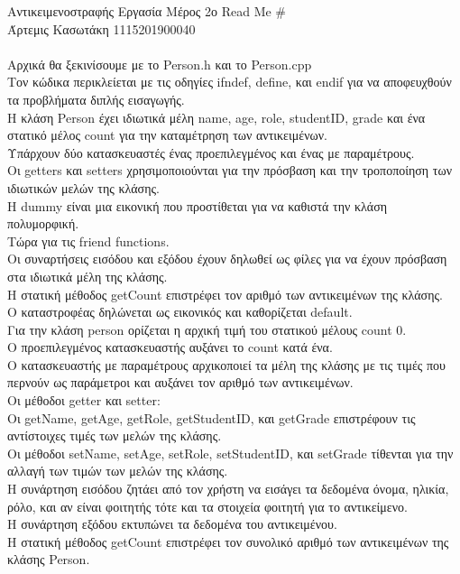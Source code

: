\documentclass[12pt]{article}
\begin{document}
\noindent Αντικειμενοστραφής Εργασία Μέρος 2ο \hfill Read Me \#\\
Άρτεμις Κασωτάκη 1115201900040
\\ \\ 

Αρχικά θα ξεκινίσουμε με το Person.h και το Person.cpp\\
Τον κώδικα περικλείεται με τις οδηγίες ifndef, define, και endif για να αποφευχθούν τα προβλήματα διπλής εισαγωγής. \\
Η κλάση Person έχει ιδιωτικά μέλη name, age, role, studentID, grade και ένα στατικό μέλος count για την καταμέτρηση των αντικειμένων.\\
Υπάρχουν δύο κατασκευαστές ένας προεπιλεγμένος και ένας με παραμέτρους.\\
Οι getters και setters χρησιμοποιούνται για την πρόσβαση και την τροποποίηση των ιδιωτικών μελών της κλάσης.\\
Η  dummy είναι μια εικονική  που προστίθεται για να καθιστά την κλάση πολυμορφική.\\
Τώρα για τις friend functions.\\
Οι συναρτήσεις εισόδου και εξόδου έχουν δηλωθεί ως φίλες για να έχουν πρόσβαση στα ιδιωτικά μέλη της κλάσης.\\
Η στατική μέθοδος getCount επιστρέφει τον αριθμό των αντικειμένων της κλάσης.\\
Ο καταστροφέας δηλώνεται ως εικονικός και καθορίζεται default.\\

Για την κλάση person ορίζεται η αρχική τιμή του στατικού μέλους count 0.\\
Ο προεπιλεγμένος κατασκευαστής αυξάνει το count κατά ένα.\\
Ο κατασκευαστής με παραμέτρους αρχικοποιεί τα μέλη της κλάσης με τις τιμές που περνούν ως παράμετροι και αυξάνει τον αριθμό των αντικειμένων.\\
Οι μέθοδοι getter και setter: \\
Οι getName, getAge, getRole, getStudentID, και getGrade επιστρέφουν τις αντίστοιχες τιμές των μελών της κλάσης.\\
Οι μέθοδοι setName, setAge, setRole, setStudentID, και setGrade τίθενται για την αλλαγή των τιμών των μελών της κλάσης.\\
Η συνάρτηση εισόδου ζητάει από τον χρήστη να εισάγει τα δεδομένα όνομα, ηλικία, ρόλο, και αν είναι φοιτητής τότε και τα στοιχεία φοιτητή για το αντικείμενο.\\
Η συνάρτηση εξόδου εκτυπώνει τα δεδομένα του αντικειμένου.\\
Η στατική μέθοδος getCount επιστρέφει τον συνολικό αριθμό των αντικειμένων της κλάσης Person.\\
\end{document}
